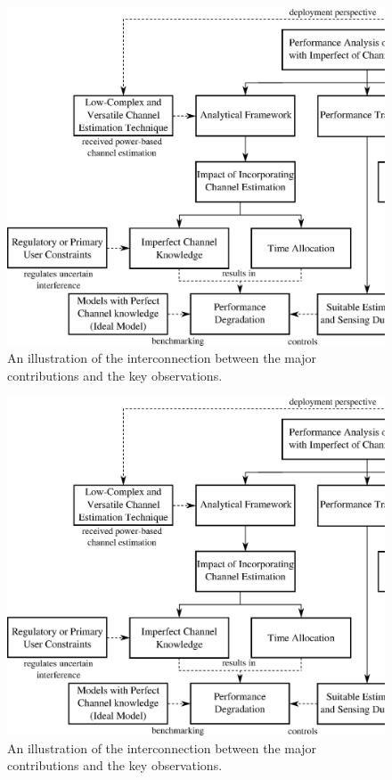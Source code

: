 \ifdebug
\begin{figure}
        \centering
        \includegraphics[width=\textheight]{figures/Contri}
        \caption{An illustration of the interconnection between the major contributions and the key observations.}
        \label{fig_Int:contri}
\end{figure}
\else
\begin{figure}
        \centering
        \includegraphics[width=\textheight]{figures/Contri}
        \caption{An illustration of the interconnection between the major contributions and the key observations.}
        \label{fig_Int:contri}
\end{figure}
\fi

